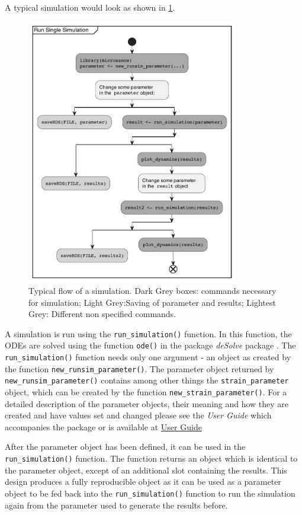 \documentclass[]{elsarticle} %
\begin{document}
A typical simulation would look as shown in \ref{fig:runsim_example}.

\begin{figure}

{\centering \includegraphics[width=350px]{./figures/simflow} 

}

\caption{Typical flow of a simulation. Dark Grey boxes: commands necessary for simulation; Light Grey:Saving of parameter and results; Lightest Grey: Different non specified commands.}\label{fig:runsim_example}
\end{figure}

A simulation is run using the \texttt{run\_simulation()} function. In
this function, the ODEs are solved using the function \texttt{ode()} in
the package \emph{deSolve} package \citep{Soetaert2010}. The
\texttt{run\_simulation()} function needs only one argument - an object
as created by the function \texttt{new\_runsim\_parameter()}. The
parameter object returned by \texttt{new\_runsim\_parameter()} contains
among other things the \texttt{strain\_parameter} object, which can be
created by the function \texttt{new\_strain\_parameter()}. For a
detailed description of the parameter objects, their meaning and how
they are created and have values set and changed please see the
\emph{User Guide} which accompanies the package or is available at
\href{@LINK_NEEDED}{User Guide}

After the parameter object has been defined, it can be used in the
\texttt{run\_simulation()} function. The function returns an object
which is identical to the parameter object, except of an additional slot
containing the results. This design produces a fully reproducible object
as it can be used as a parameter object to be fed back into the
\texttt{run\_simulation()} function to run the simulation again from the
parameter used to generate the results before.
\end{document}
